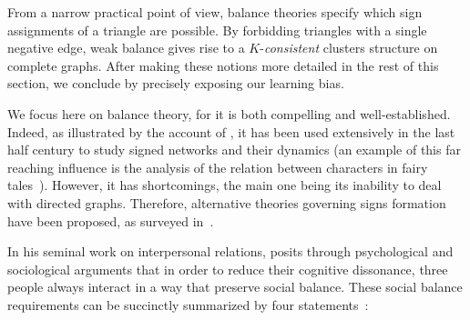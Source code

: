From a narrow practical point of view, balance theories specify which sign assignments of a triangle
are possible. By forbidding triangles with a single negative edge, weak balance gives rise to a
$K$-\emph{consistent} clusters structure on complete graphs. After making these notions more detailed
in the rest of this section, we conclude by precisely exposing our learning bias.

\begin{aside}
We focus here on balance theory, for it is both compelling and well-established.
Indeed, as illustrated by the account of \textcite{CSBalanceSurvey15}, it has been used extensively
in the last half century to study signed networks and their dynamics (an example of this far
reaching influence is the analysis of the relation between characters in fairy
tales~\autocite{fairyTales80}).
However, it has shortcomings, the main one being its inability to deal with directed graphs.
Therefore, alternative theories governing signs formation have been proposed, as surveyed
in~\autocite{Yap2015}.
\end{aside}

In his seminal work on interpersonal relations,
\textcite{Heider46} posits through
psychological and sociological arguments that in order to reduce their cognitive dissonance, three
people always interact in a way that preserve social balance. These social balance requirements can be
succinctly summarized by four statements~\autocite{HeiderBook58}:


